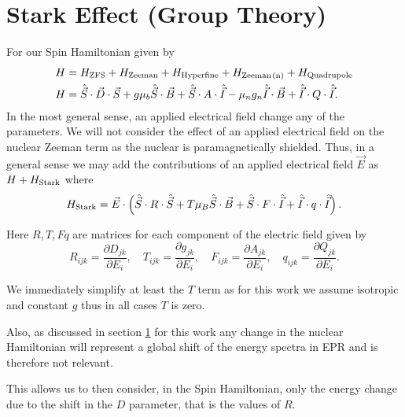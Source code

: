 \section{Stark Effect (Group Theory)}
For our Spin Hamiltonian given by 
\begin{equation}
    \begin{align}
        H &= H_{\ce{ZFS}} + H_{\ce{Zeeman}} + H_{\ce{Hyperfine}} + H_{\ce{Zeeman(n)}}+ H_{\ce{Quadrupole}}\\ 
        H &= \hat{\vec{S}}\cdot{\vec{D}}\cdot{\vec{S}} + g\mu_b \hat{\vec{S}}\cdot \vec{B}  + \hat{\vec{S}}\cdot A \cdot \hat{\vec{I}}  -  \mu_n g_n \hat{\vec{I}}\cdot\vec{B} + \hat{\vec{I}} \cdot Q \cdot \hat{\vec{I}}.
    \end{align}
\end{equation}
In the most general sense, an applied electrical field change any of the parameters. We will not consider the effect of an applied electrical field on the nuclear Zeeman term as the nuclear is paramagnetically shielded. Thus, in a general sense we may add the contributions of an applied electrical field $\vec{E}$ as $H + H_{\ce{Stark}}$ where 
\begin{equation}
    H_{\ce{Stark}} = \vec{E}\cdot\left(\hat{\vec{S}}\cdot R \cdot \hat{\vec{S}} + T \mu_B \hat{\vec{S}}\cdot \vec{B} + \hat{\vec{S}}\cdot F \cdot \hat{\vec{I}} + \hat{\vec{I}} \cdot q \cdot \hat{\vec{I}} \right). 
    \label{eq:}
\end{equation}%

Here $R, T, F q$ are matrices for each component of the electric field given by 
\begin{equation}
    R_{ijk} = \frac{\partial D_{jk}}{\partial E_i}, \quad 
    T_{ijk} = \frac{\partial g_{jk}}{\partial E_i}, \quad 
    F_{ijk} = \frac{\partial A_{jk}}{\partial E_i}, \quad 
    q_{ijk} = \frac{\partial Q_{jk}}{\partial E_i}.
    \label{eq:}
\end{equation}

We immediately simplify at least the $T$ term as for this work we assume isotropic and constant $g$ thus in all cases $T$ is zero.  

Also, as discussed in section \ref{} for this work any change in the nuclear Hamiltonian will represent a global shift of the energy spectra in EPR and is therefore not relevant. 

This allows us to then consider, in the Spin Hamiltonian, only the energy change due to the shift in the $D$ parameter, that is the values of $R$. 

